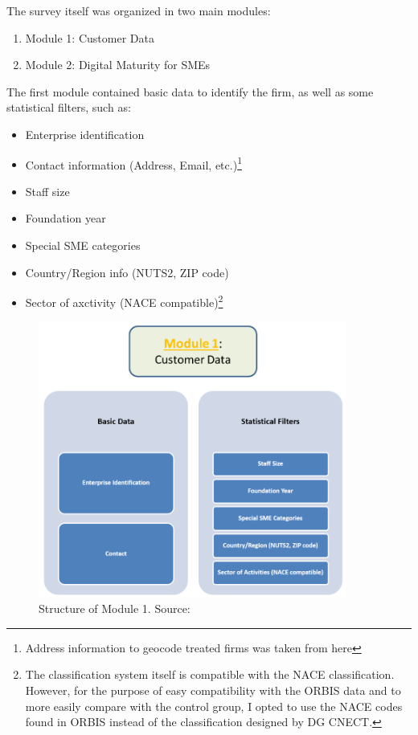 \documentclass[12pt]{report}
\begin{document}
\par The survey itself was organized in two main modules:
\begin{enumerate}
    \item Module 1: Customer Data
    \item Module 2: Digital Maturity for SMEs
\end{enumerate}

\par The first module contained basic data to identify the firm, as well as some statistical filters, such as:
\begin{itemize}
    \item Enterprise identification
    \item Contact information (Address, Email, etc.)\footnote{Address information to geocode  treated firms was taken from here}
    \item Staff size
    \item Foundation year
    \item Special SME categories
    \item Country/Region info (NUTS2, ZIP code)
    \item Sector of axctivity (NACE compatible)\footnote{The classification system itself is compatible with the NACE classification. However, for the purpose of easy compatibility with the ORBIS data and to more easily compare with the control group, I opted to use the NACE codes found in ORBIS instead of the classification designed by DG CNECT.}
\end{itemize}

\begin{figure}[ht]
    \centering
    \includegraphics[width=0.9\textwidth]{Figures/02-dmamodule1structure.png}
    \caption{Structure of Module 1. Source: \cite{jrc_dmamanual}}
    \label{fig:dma_module1_survey_structure}
\end{figure}
\end{document}
